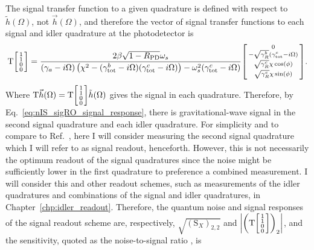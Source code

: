 The signal transfer function to a given quadrature is defined with respect to $\tilde h(\Omega)$, not $\vec h(\Omega)$, and therefore the vector of signal transfer functions to each signal and idler quadrature at the photodetector is
\begin{equation}\label{eq:nIS_sigRO_signal_response}
\text{T}\begin{bsmallmatrix}1 \\1\\0\\0\end{bsmallmatrix} = \frac{2 \beta \sqrt{1-R_\text{PD}} \omega_s}{(\gamma_a-i \Omega ) \left(\chi ^2-(\gamma^b_\text{tot}-i\Omega) (\gamma^c_\text{tot}-i\Omega)\right)-\omega_s^2 (\gamma^c_\text{tot}-i \Omega )} \begin{bsmallmatrix}0 \\-\sqrt{\gamma^b_R}(\gamma^c_\text{tot}-i\Omega)\\\sqrt{\gamma^c_R}\chi\cos(\phi)\\\sqrt{\gamma^c_R}\chi\sin(\phi)\end{bsmallmatrix}.
\end{equation}
Where $\text{T}\vec h(\Omega)=\text{T}\begin{bsmallmatrix}1 \\1\\0\\0\end{bsmallmatrix}\tilde h(\Omega)$ gives the signal in each quadrature.
Therefore, by Eq.~\ref{eq:nIS_sigRO_signal_response}, there is gravitational-wave signal in the second signal quadrature and each idler quadrature. For simplicity and to compare to Ref.~\cite{liBroadbandSensitivityImprovement2020}, here I will consider measuring the second signal quadrature which I will refer to as signal readout, henceforth. However, this is not necessarily the optimum readout of the signal quadratures since the noise might be sufficiently lower in the first quadrature to preference a combined measurement. I will consider this and other readout schemes, such as measurements of the idler quadratures and combinations of the signal and idler quadratures, in Chapter~\ref{chp:idler_readout}.
Therefore, the quantum noise and signal responses of the signal readout scheme are, respectively, $\sqrt{(\text{S}_X)_{2,2}}$ and $\abs{\left(\text{T}\begin{bsmallmatrix}1 \\1\\0\\0\end{bsmallmatrix}\right)_2}$, and the sensitivity, quoted as the noise-to-signal ratio , is
